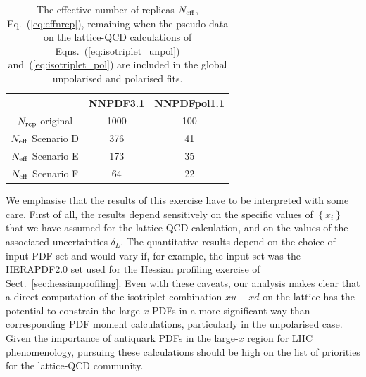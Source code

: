 \begin{table}[h!]
  \centering
  \renewcommand{\arraystretch}{1.3} 
  \begin{tabular}{c|c|c}
    \hline
    &  NNPDF3.1  &  NNPDFpol1.1 \\
    \hline
    \hline
    $N_{\rm rep}$ original   &   1000 &  100   \\
    \hline
     $N_{\rm eff}$ Scenario D    &   376  &  41   \\
     $N_{\rm eff}$ Scenario E    &   173   &   35  \\
     $N_{\rm eff}$ Scenario F   &   64  &   22  \\
    \hline
  \end{tabular}
  \caption{\small The effective number of replicas
    $N_{\rm eff}$, Eq.~(\ref{eq:effnrep}), remaining when the pseudo-data
    on the lattice-QCD calculations
    of Eqns.~(\ref{eq:isotriplet_unpol})
and~(\ref{eq:isotriplet_pol}) 
   are included in the global
    unpolarised and polarised fits. 
    \label{tab:neffxspace}
  }
\end{table}

We emphasise that
the results of this exercise have to be interpreted
with some care.
%
First of all, the results depend sensitively on the specific values of
$\left\{ x_i \right\}$
that we have assumed for the lattice-QCD calculation,
and on the values
of the associated uncertainties $\delta_L$.
%
The quantitative results depend on the choice of input PDF set and would 
vary if, for example, the input set was the HERAPDF2.0 set used for the 
Hessian profiling exercise of Sect.~\ref{sec:hessianprofiling}.
%
Even with these caveats, our analysis makes clear that a direct
computation of the isotriplet combination $x u-x d$ on the lattice
has the potential to constrain the large-$x$ PDFs in
a more significant way than corresponding PDF moment calculations,
particularly in the unpolarised case.
%
Given the importance of antiquark PDFs in the large-$x$ region for LHC phenomenology,
pursuing these calculations should be high on the list
of priorities for the lattice-QCD community.

